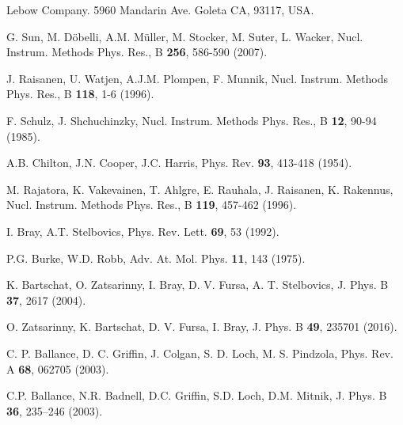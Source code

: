 \begin{thebibliography}{9}
Lebow Company. 5960 Mandarin Ave. Goleta CA, 93117, USA.

G. Sun, M. D\"{o}belli, A.M. M\"{u}ller, M. Stocker, M. Suter, L. Wacker, 
Nucl. Instrum. Methods Phys. Res., B \textbf{256}, 586-590 (2007).

J. Raisanen, U. Watjen, A.J.M. Plompen, F. Munnik, 
Nucl. Instrum. Methods Phys. Res., B \textbf{118}, 1-6  (1996).

F. Schulz, J. Shchuchinzky, 
Nucl. Instrum. Methods Phys. Res., B \textbf{12},  90-94 (1985).

A.B. Chilton, J.N. Cooper, J.C. Harris, 
Phys. Rev. \textbf{93}, 413-418  (1954).

M. Rajatora, K. Vakevainen, T. Ahlgre, E. Rauhala, J. Raisanen, K. Rakennus, 
Nucl. Instrum. Methods Phys. Res., B \textbf{119}, 457-462 (1996).




I. Bray, A.T. Stelbovics, 
Phys. Rev. Lett. \textbf{69}, 53 (1992).

P.G. Burke, W.D. Robb, 
Adv. At. Mol. Phys. \textbf{11}, 143 (1975).

K. Bartschat, O. Zatsarinny, I. Bray, D. V. Fursa, A. T. Stelbovics,
J. Phys. B \textbf{37}, 2617 (2004).

O. Zatsarinny, K. Bartschat, D. V. Fursa, I. Bray,
J. Phys. B \textbf{49}, 235701 (2016).

C. P. Ballance, D. C. Griffin, J. Colgan, S. D. Loch, M. S. Pindzola,
Phys. Rev. A \textbf{68}, 062705 (2003).

C.P. Ballance, N.R. Badnell, D.C. Griffin, S.D. Loch, D.M. Mitnik, 
J. Phys. B \textbf{36}, 235--246 (2003).


\end{thebibliography}
